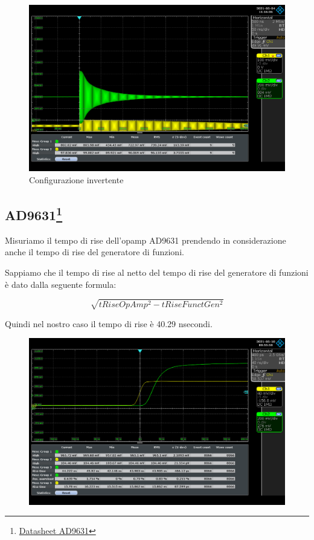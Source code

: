\begin{figure}[H]
\centering
\includegraphics[width=\textwidth]{assets/exp8/Screenshot_2021-05-04_1_111636.png}
\caption{Configurazione invertente}
\end{figure}



\subsection*{AD9631\footnote{\href{https://www.analog.com/media/en/technical-documentation/data-sheets/AD9631_9632.pdf}{Datasheet AD9631}}}

Misuriamo il tempo di rise dell'opamp AD9631 prendendo in considerazione anche il tempo di rise del generatore di funzioni.

Sappiamo che il tempo di rise al netto del tempo di rise del generatore di funzioni è dato dalla seguente formula:

\begin{displaymath}
 \sqrt{tRiseOpAmp^2 - tRiseFunctGen^2}
\end{displaymath}

Quindi nel nostro caso il tempo di rise è 40.29 nsecondi.

\begin{figure}[H]
\centering
\includegraphics[width=\textwidth]{assets/exp8/Screenshot_2021-05-10_0_085558.png}
\end{figure}

